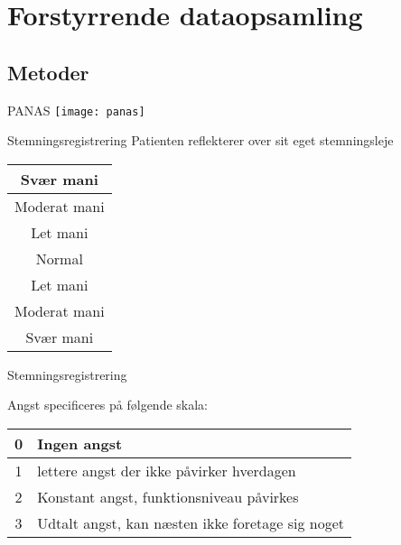 \section{Forstyrrende dataopsamling}
	
\subsection{Metoder}

{ %
\begin{frame}{PANAS} %
\texttt{[image: panas]}
	
\end{frame}}

{ %
	\begin{frame}{Stemningsregistrering} %
		Patienten reflekterer over sit eget stemningsleje
		
		\begin{center}
		\begin{tabular}{|c|}
			\hline \cellcolor{red!90} Svær mani \\ 
			\hline \cellcolor{red!60} Moderat mani \\ 
			\hline \cellcolor{red!30} Let mani \\ 
			\hline \cellcolor{yellow!70} Normal \\ 
			\hline \cellcolor{blue!30} Let mani \\ 
			\hline \cellcolor{blue!60} Moderat mani \\ 
			\hline \cellcolor{blue!90} Svær mani \\ 
			\hline 
		\end{tabular} 
		\end{center}
	\end{frame}}
	
{ %
	\begin{frame}{Stemningsregistrering} %

		Angst specificeres på følgende skala:
		\begin{tabular}{| c | l|}
			\hline 0 & Ingen angst \\ 
			\hline 1 & lettere angst der ikke påvirker hverdagen\\ 
			\hline 2 & Konstant angst, funktionsniveau påvirkes\\ 
			\hline 3 & Udtalt angst, kan næsten ikke foretage sig noget\\
			\hline
		\end{tabular} 
	\end{frame}}
	
